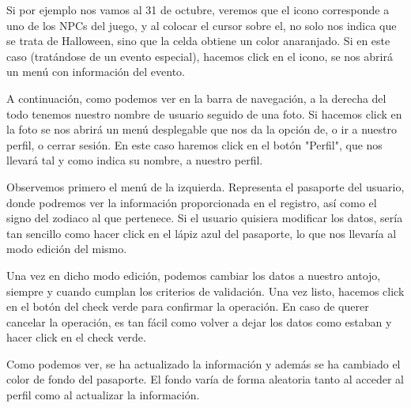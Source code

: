 
Si por ejemplo nos vamos al 31 de octubre, veremos que el icono corresponde a uno de los NPCs del juego, y al colocar el cursor sobre el, no solo nos indica que se trata de Halloween, sino que la celda obtiene un color anaranjado. Si en este caso (tratándose de un evento especial), hacemos click en el icono, se nos abrirá un menú con información del evento.\\



A continuación, como podemos ver en la barra de navegación, a la derecha del todo tenemos nuestro nombre de usuario seguido de una foto. Si hacemos click en la foto se nos abrirá un menú desplegable que nos da la opción de, o ir a nuestro perfil, o cerrar sesión. En este caso haremos click en el botón "Perfil", que nos llevará tal y como indica su nombre, a nuestro perfil.\\



Observemos primero el menú de la izquierda. Representa el pasaporte del usuario, donde podremos ver la información proporcionada en el registro, así como el signo del zodiaco al que pertenece. Si el usuario quisiera modificar los datos, sería tan sencillo como hacer click en el lápiz azul del pasaporte, lo que nos llevaría al modo edición del mismo.\\


Una vez en dicho modo edición, podemos cambiar los datos a nuestro antojo, siempre y cuando cumplan los criterios de validación. Una vez listo, hacemos click en el botón del check verde para confirmar la operación. En caso de querer cancelar la operación, es tan fácil como volver a dejar los datos como estaban y hacer click en el check verde.\\


Como podemos ver, se ha actualizado la información y además se ha cambiado el color de fondo del pasaporte. El fondo varía de forma aleatoria tanto al acceder al perfil como al actualizar la información.\\

